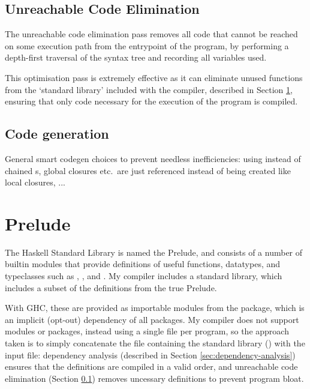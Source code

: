 \documentclass[dissertation.tex]{subfiles}
\begin{document}
{{    }
    \subsection{Unreachable Code Elimination}\label{sec:unreachable-elim}
    {

        The unreachable code elimination pass removes all code that cannot be reached on some execution path from
        the entrypoint of the program, by performing a depth-first traversal of the syntax tree and recording all
        variables used.

        This optimisation pass is extremely effective as it can eliminate unused functions from the `standard
        library' included with the compiler, described in Section \ref{sec:prelude}, ensuring that only code
        necessary for the execution of the program is compiled.

    }
    \subsection{Code generation}
    {

        General smart codegen choices to prevent needless inefficiencies: using  instead of
        chained s, global closures etc.\ are just referenced instead of being created like local
        closures, ...


    }
}
\section{Prelude}\label{sec:prelude}
{

    The Haskell Standard Library is named the Prelude, and consists of a number of builtin modules that provide
    definitions of useful functions, datatypes, and typeclasses such as , , and
    . My compiler includes a standard library, which includes a subset of the definitions from the
    true Prelude.
    
    With GHC, these are provided as importable modules from the  package, which is an implicit
    (opt-out) dependency of all packages. My compiler does not support modules or packages, instead using a single
    file per program, so the approach taken is to simply concatenate the file containing the standard library
    () with the input file: dependency analysis (described in Section
    \ref{sec:dependency-analysis}) ensures that the definitions are compiled in a valid order, and unreachable code
    elimination (Section \ref{sec:unreachable-elim}) removes uncessary definitions to prevent program bloat.

}
\end{document}
